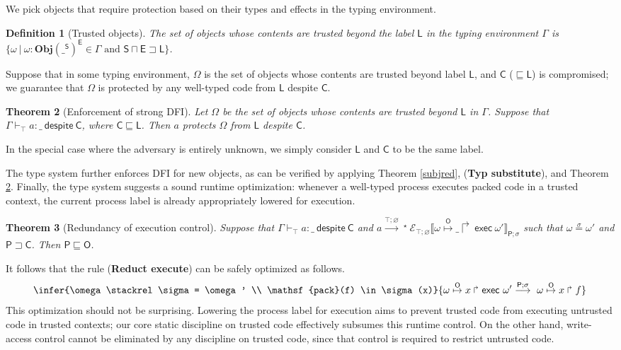 \documentclass{sigplanconf}
\newcommand{\lab}{\mathsf L}
\newcommand{\labp}{\mathsf P}
\newcommand{\labo}{\mathsf O}
\newcommand{\labb}{\mathsf S}
\newcommand{\labt}{\mathsf E}
\newcommand{\labc}{\mathsf C}
\newcommand{\action}[1]{\stackrel{#1}{\longrightarrow}~}
\newcommand{\fork}[2]{#1\Rsh\:\!#2}
\newcommand{\store}[1]{\stackrel{#1}\mapsto}
\newcommand{\llctx}[3]{\mathcal E_{#1}\llbracket#2\rrbracket_{#3}}
\newcommand{\trule}[1]{(\textbf{Typ #1})}
\newcommand{\rrule}[1]{\textbf{Reduct #1}}
\newtheorem{definition}{Definition}[section]
\newtheorem{theorem}[definition]{Theorem}
\begin{document}
We pick objects that require protection based on their types and effects in the typing environment.
\begin{definition}[Trusted objects] The set of objects whose contents are trusted beyond the label $\lab$ in the typing environment $\Gamma$ is $\{\omega~|~\omega :
  \mathbf{Obj}(\_^{\labb})^{\labt} \in \Gamma\mbox{ and }\labb \sqcap \labt \sqsupset
  \lab\}$.
\end{definition}
Suppose that in some typing environment, $\Omega$ is the set of objects whose contents are trusted beyond label $\lab$, and $\labc$ ($\sqsubseteq \lab$) is compromised; we guarantee that $\Omega$ is protected by any well-typed code from $\lab$ despite $\labc$.
\begin{theorem}[Enforcement of strong DFI]\label{mainthm} Let
  $\Omega$ be the set of objects whose contents are trusted beyond $\lab$ in $\Gamma$. Suppose that $\Gamma
  \vdash_\top a : \_~\mathsf{despite}~\labc$, where $\labc \sqsubseteq \lab$. Then $a$
  protects $\Omega$ from $\lab$ despite $\labc$. 
\end{theorem}
In the special case where the adversary is entirely unknown, we simply consider $\lab$ and $\labc$ to be the same label. 

The type system further enforces DFI for new objects, as can be verified by applying Theorem \ref{subjred}, \trule{substitute}, and Theorem \ref{mainthm}. 
Finally, the type system suggests a sound runtime optimization:
whenever a well-typed process executes packed code in a trusted context, the current process label is already appropriately lowered for execution. 
\begin{theorem}[Redundancy of execution control]\label{optim} Suppose that $\Gamma \vdash_{\top} a : \_ ~\mathsf{despite}~\labc$ and  
$a \action{\top;\varnothing}\!\!\!\!{}^\star ~\llctx{\top;\varnothing}{\fork{\omega \store{\labo} \_} \mathsf{exec}\:\omega'}{\labp;\sigma}$ such that $\omega\stackrel\sigma= \omega'$ and $\labp \sqsupset\labc$. Then $\labp \sqsubseteq \labo$. \end{theorem}
It follows that the rule (\rrule{execute}) can be safely optimized as follows.
$$\infer
    {\omega\stackrel\sigma= \omega' \\ \mathsf{pack}(f) \in \sigma(x)}
    {\fork{\omega \store{\labo} x}\mathsf{exec}~\omega' \action{\labp;\sigma} \fork{\omega \store{\labo} x}f}
$$
This optimization should not be surprising. Lowering the process label for execution aims to prevent trusted code from executing untrusted code in trusted contexts; our core static discipline on trusted code effectively subsumes this runtime control. 
 On the other hand, write-access control cannot be eliminated by any discipline on trusted code, since that control is required to restrict untrusted code. 
\end{document}
